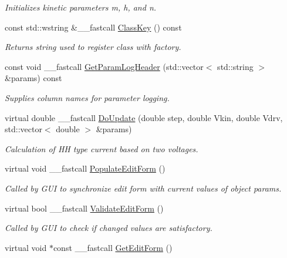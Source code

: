 \begin{DoxyCompactItemize}
\begin{DoxyCompactList}\small\item\em Initializes kinetic parameters m, h, and n. \end{DoxyCompactList}\item 
const std\+::wstring \&\+\_\+\+\_\+fastcall \hyperlink{class_t_h_h_current_a49049acfa420622d26011f881c432329}{Class\+Key} () const 
\begin{DoxyCompactList}\small\item\em Returns string used to register class with factory. \end{DoxyCompactList}\item 
const void \+\_\+\+\_\+fastcall \hyperlink{class_t_h_h_current_aff79f9a9aa07c2496fcabe97f2ce04a9}{Get\+Param\+Log\+Header} (std\+::vector$<$ std\+::string $>$ \&params) const 
\begin{DoxyCompactList}\small\item\em Supplies column names for parameter logging. \end{DoxyCompactList}\item 
virtual double \+\_\+\+\_\+fastcall \hyperlink{class_t_h_h_current_acaa8176752a6ccc45611d0c80b1a971a}{Do\+Update} (double step, double Vkin, double Vdrv, std\+::vector$<$ double $>$ \&params)
\begin{DoxyCompactList}\small\item\em Calculation of H\+H type current based on two voltages. \end{DoxyCompactList}\item 
\hypertarget{class_t_h_h_current_a6ca4ed77afc56eef5e3bd9ac72c15591}{virtual void \+\_\+\+\_\+fastcall \hyperlink{class_t_h_h_current_a6ca4ed77afc56eef5e3bd9ac72c15591}{Populate\+Edit\+Form} ()}\label{class_t_h_h_current_a6ca4ed77afc56eef5e3bd9ac72c15591}

\begin{DoxyCompactList}\small\item\em Called by G\+U\+I to synchronize edit form with current values of object params. \end{DoxyCompactList}\item 
\hypertarget{class_t_h_h_current_ad147e9579b018f50a6c4244b21e4d105}{virtual bool \+\_\+\+\_\+fastcall \hyperlink{class_t_h_h_current_ad147e9579b018f50a6c4244b21e4d105}{Validate\+Edit\+Form} ()}\label{class_t_h_h_current_ad147e9579b018f50a6c4244b21e4d105}

\begin{DoxyCompactList}\small\item\em Called by G\+U\+I to check if changed values are satisfactory. \end{DoxyCompactList}\item 
\hypertarget{class_t_h_h_current_a3529515fbe5fbcce14fedca3a8db5e04}{virtual void $\ast$const \+\_\+\+\_\+fastcall \hyperlink{class_t_h_h_current_a3529515fbe5fbcce14fedca3a8db5e04}{Get\+Edit\+Form} ()}\label{class_t_h_h_current_a3529515fbe5fbcce14fedca3a8db5e04}


\end{DoxyCompactItemize}
